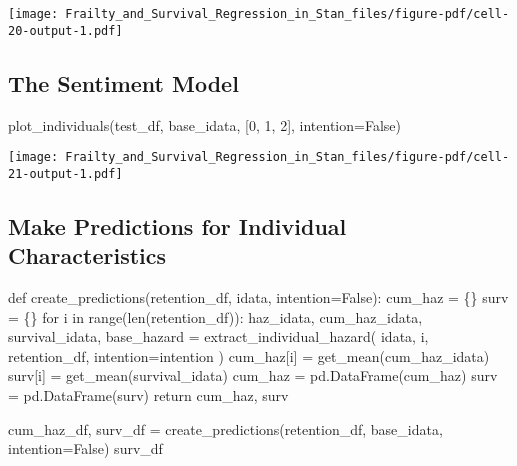 \documentclass[
  letterpaper,
  DIV=11,
  numbers=noendperiod]{scrartcl}
\newenvironment{Shaded}{\begin{snugshade}}{\end{snugshade}}
\newcommand{\BuiltInTok}[1]{\textcolor[rgb]{0.00,0.23,0.31}{#1}}
\newcommand{\ControlFlowTok}[1]{\textcolor[rgb]{0.00,0.23,0.31}{#1}}
\newcommand{\DecValTok}[1]{\textcolor[rgb]{0.68,0.00,0.00}{#1}}
\newcommand{\KeywordTok}[1]{\textcolor[rgb]{0.00,0.23,0.31}{#1}}
\newcommand{\NormalTok}[1]{\textcolor[rgb]{0.00,0.23,0.31}{#1}}
\newcommand{\OperatorTok}[1]{\textcolor[rgb]{0.37,0.37,0.37}{#1}}
\newcommand{\VariableTok}[1]{\textcolor[rgb]{0.07,0.07,0.07}{#1}}
\begin{document}
\texttt{[image: Frailty\_and\_Survival\_Regression\_in\_Stan\_files/figure-pdf/cell-20-output-1.pdf]}

\subsection{The Sentiment Model}\label{the-sentiment-model}

\begin{Shaded}
\begin{Highlighting}[]
\NormalTok{plot\_individuals(test\_df, base\_idata, [}\DecValTok{0}\NormalTok{, }\DecValTok{1}\NormalTok{, }\DecValTok{2}\NormalTok{], intention}\OperatorTok{=}\VariableTok{False}\NormalTok{)}
\end{Highlighting}
\end{Shaded}

\texttt{[image: Frailty\_and\_Survival\_Regression\_in\_Stan\_files/figure-pdf/cell-21-output-1.pdf]}

\subsection{Make Predictions for Individual
Characteristics}\label{make-predictions-for-individual-characteristics}

\begin{Shaded}
\begin{Highlighting}[]
\KeywordTok{def}\NormalTok{ create\_predictions(retention\_df, idata, intention}\OperatorTok{=}\VariableTok{False}\NormalTok{):}
\NormalTok{    cum\_haz }\OperatorTok{=}\NormalTok{ \{\}}
\NormalTok{    surv }\OperatorTok{=}\NormalTok{ \{\}}
    \ControlFlowTok{for}\NormalTok{ i }\KeywordTok{in} \BuiltInTok{range}\NormalTok{(}\BuiltInTok{len}\NormalTok{(retention\_df)):}
\NormalTok{        haz\_idata, cum\_haz\_idata, survival\_idata, base\_hazard }\OperatorTok{=}\NormalTok{ extract\_individual\_hazard(}
\NormalTok{            idata, i, retention\_df, intention}\OperatorTok{=}\NormalTok{intention}
\NormalTok{        )}
\NormalTok{        cum\_haz[i] }\OperatorTok{=}\NormalTok{ get\_mean(cum\_haz\_idata)}
\NormalTok{        surv[i] }\OperatorTok{=}\NormalTok{ get\_mean(survival\_idata)}
\NormalTok{    cum\_haz }\OperatorTok{=}\NormalTok{ pd.DataFrame(cum\_haz)}
\NormalTok{    surv }\OperatorTok{=}\NormalTok{ pd.DataFrame(surv)}
    \ControlFlowTok{return}\NormalTok{ cum\_haz, surv}


\NormalTok{cum\_haz\_df, surv\_df }\OperatorTok{=}\NormalTok{ create\_predictions(retention\_df, base\_idata, intention}\OperatorTok{=}\VariableTok{False}\NormalTok{)}
\NormalTok{surv\_df}
\end{Highlighting}
\end{Shaded}
\end{document}
